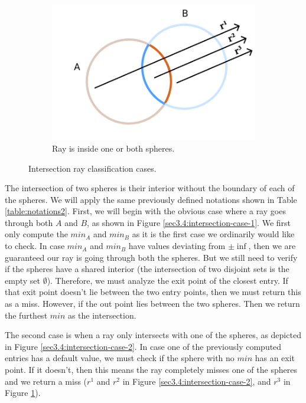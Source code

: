 \documentclass[a4paper,11pt,oneside]{article}
\begin{document}
\begin{figure}[ht]
\begin{subfigure}[b]{0.3\textwidth}
         \includegraphics[width=\textwidth]{section3/3.4/intersection-case-3.png}
         \caption{Ray is inside one or both spheres.}
         \label{sec3.4:intersection-case-3}
     \end{subfigure}
        \caption{Intersection ray classification cases.}
        \label{sec3.4:sphere-intersection}
\end{figure}

The intersection of two spheres is their interior without the boundary of each of the spheres. We will apply the same previously defined notations shown in Table \ref{table:notations2}. First, we will begin with the obvious case where a ray goes through both $A$ and $B$, as shown in Figure \ref{sec3.4:intersection-case-1}. We first only compute the $min_A$ and $min_B$ as it is the first case we ordinarily would like to check. In case $min_A$ and $min_B$ have values deviating from $\pm\inf$, then we are guaranteed our ray is going through both the spheres. But we still need to verify if the spheres have a shared interior (the intersection of two disjoint sets is the empty set $\emptyset$). Therefore, we must analyze the exit point of the closest entry. If that exit point doesn't lie between the two entry points, then we must return this as a miss. However, if the out point lies between the two spheres. Then we return the furthest $min$ as the intersection. 

The second case is when a ray only intersects with one of the spheres, as depicted in Figure \ref{sec3.4:intersection-case-2}. In case one of the previously computed entries has a default value, we must check if the sphere with no $min$ has an exit point. If it doesn't, then this means the ray completely misses one of the spheres and we return a miss ($r^1$ and $r^2$ in Figure \ref{sec3.4:intersection-case-2}, and $r^3$ in Figure \ref{sec3.4:intersection-case-3}). 
\end{document}
